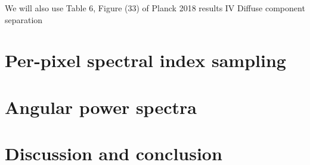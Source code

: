 \documentclass[twocolumn]{../../common/aa}
\begin{document}



We will also use Table 6, Figure (33)
of Planck 2018 results IV Diffuse component separation


\section{Per-pixel spectral index sampling}


\section{Angular power spectra}

\section{Discussion and conclusion}
\label{sec:conclusion}






%




\end{document}
